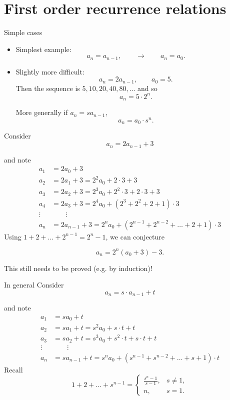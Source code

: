 \documentclass{beamer}
\def\bl[#1]#2{\begin{block}{#1}#2\end{block}}
\def\itemb{\begin{itemize}}
\def\iteme{\end{itemize}}
\begin{document}
\section{First order recurrence relations}
\begin{frame}{Simple cases}
\itemb
\item Simplest example:
\[
a_n=a_{n-1},\qquad\to\qquad a_n=a_0.
\]
\item Slightly more difficult:
\[
a_n=2a_{n-1},\qquad a_0=5.
\]
Then the sequence is $5,10,20,40,80,\dots$ and so 
\[
a_n=5\cdot 2^n.
\]

More generally if $a_n=sa_{n-1}$,
\[
a_n=a_0\cdot s^n.
\]
\iteme
\end{frame}

\begin{frame}
Consider
\[
a_{n}=2a_{n-1}+3
\]\vspace{-0.7cm}

and note\vspace{-0.3cm}
\begin{align*}
a_1&=2a_0+3\\
a_2&=2a_1+3=2^2a_0+2\cdot 3+3\\
a_3&=2a_2+3=2^3a_0+2^2\cdot 3+2\cdot 3+3\\
a_4&=2a_3+3=2^4a_0+(2^3+2^2+2+1)\cdot 3\\
\vdots&\qquad\vdots\\
a_n&=2a_{n-1}+3=2^na_0+(2^{n-1}+2^{n-2}+\dots+2+1)\cdot 3
\end{align*}
Using $1+2+\dots+2^{n-1}=2^n-1$, we can conjecture\vspace{-0.1cm}
\bl[]{\vspace{-0.1cm}
\[
a_n=2^n(a_0+3)-3.
\]}\vspace{-0.3cm}

\center\color{red}This still needs to be proved (e.g. by induction)!\color{black}
\end{frame}


\begin{frame}{In general}
Consider
\[
a_{n}=s\cdot a_{n-1}+t
\]\vspace{-0.7cm}

and note\vspace{-0.3cm}
\begin{align*}
a_1&=sa_0+t\\
a_2&=sa_1+t=s^2a_0+s\cdot t+t\\
a_3&=sa_2+t=s^3a_0+s^2\cdot t+s\cdot t+t\\
\vdots&\qquad\vdots\\
a_n&=sa_{n-1}+t=s^na_0+(s^{n-1}+s^{n-2}+\dots+s+1)\cdot t
\end{align*}
Recall
\[
1+2+\dots+s^{n-1}=\left\{\begin{array}{cc}
\frac{s^n-1}{s-1},&s\neq 1,\\
n,&s=1.
\end{array}\right.
\]
\end{frame}
\end{document}
